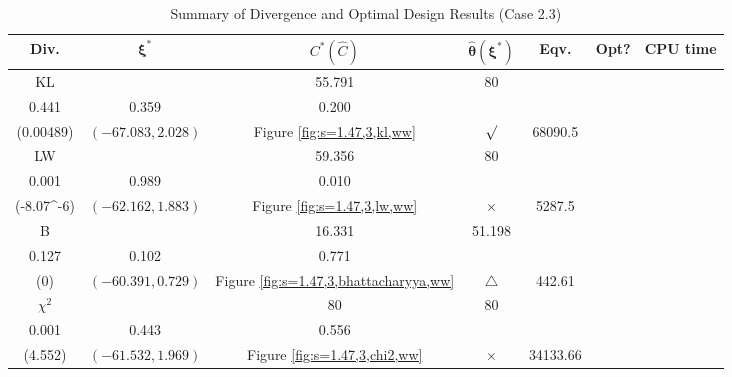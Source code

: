 \documentclass[12pt, a4paper]{article}
\begin{document}
\begin{table}[H]
\centering
\renewcommand{\arraystretch}{1.5} %
\setlength{\tabcolsep}{8pt} %
\begin{tabular}{|c|c|c|c|c|c|c|}
\hline
\textbf{Div.} & \(\boldsymbol{\xi^*}\) & \(C^* (\hat{C})\) & \(\boldsymbol{\hat{\theta}(\xi^*)}\) & \textbf{Eqv.} & \textbf{Opt?} & \textbf{CPU time} \\
\hline
KL & \(\left\{\begin{array}{ccc}
25.576 & 55.791 & 80 \\
0.441 & 0.359 & 0.200
\end{array}\right\}\) &
\(\begin{array}{c}
0.00489 \\
(0.00489)
\end{array}\) & 
\((-67.083, 2.028)\) & 
Figure \ref{fig:s=1.47,3,kl,ww} & $\surd$ & 68090.5 \\
\hline
LW & \(\left\{\begin{array}{ccc}
58.379 & 59.356 & 80 \\
0.001 & 0.989 & 0.010
\end{array}\right\}\) &
\(\begin{array}{c}
0.693 \\
(-8.07\times 10^{-6})
\end{array}\) & 
\((-62.162, 1.883)\) & 
Figure \ref{fig:s=1.47,3,lw,ww} & $\times$ & 5287.5 \\
\hline
B & \(\left\{\begin{array}{ccc}
11.236 & 16.331 & 51.198 \\
0.127 & 0.102 & 0.771
\end{array}\right\}\) &
\(\begin{array}{c}
0 \\
(0)
\end{array}\) & 
\((-60.391, 0.729)\) & 
Figure \ref{fig:s=1.47,3,bhattacharyya,ww} & $\triangle$ & 442.61 \\
\hline
\(\chi^2\) & \(\left\{\begin{array}{ccc}
41.883 & 80 & 80 \\
0.001 & 0.443 & 0.556
\end{array}\right\}\) &
\(\begin{array}{c}
5.223 \\
(4.552)
\end{array}\) & 
\((-61.532, 1.969)\) & 
Figure \ref{fig:s=1.47,3,chi2,ww} & $\times$ & 34133.66 \\
\hline
\end{tabular}
\caption{Summary of Divergence and Optimal Design Results (Case 2.3)}
\label{tab:results2.3}
\end{table}
\end{document}
